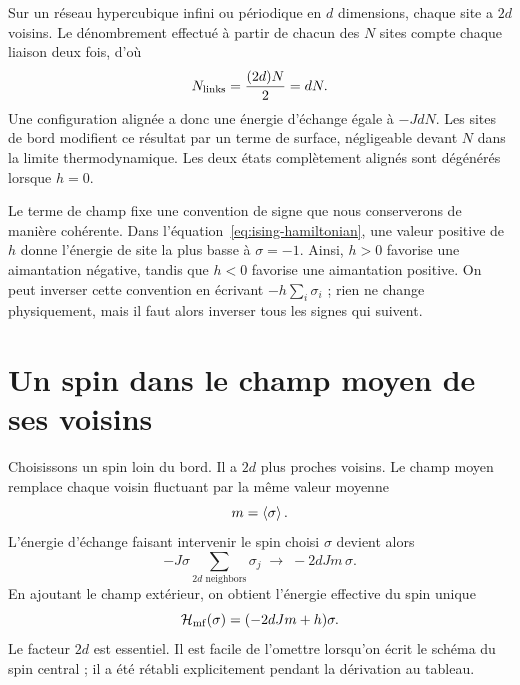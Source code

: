 Sur un réseau hypercubique infini ou périodique en \(d\) dimensions, chaque site a \(2d\) voisins. Le dénombrement effectué à partir de chacun des \(N\) sites compte chaque liaison deux fois, d’où
\begin{equation}
N_{\rm links}=\frac{(2d)N}{2}=dN.
\label{eq:number-links}
\end{equation}
Une configuration alignée a donc une énergie d’échange égale à \(-JdN\). Les sites de bord modifient ce résultat par un terme de surface, négligeable devant \(N\) dans la limite thermodynamique. Les deux états complètement alignés sont dégénérés lorsque \(h=0\).

Le terme de champ fixe une convention de signe que nous conserverons de manière cohérente. Dans l’équation~\eqref{eq:ising-hamiltonian}, une valeur positive de \(h\) donne l’énergie de site la plus basse à \(\sigma=-1\). Ainsi, \(h>0\) favorise une aimantation négative, tandis que \(h<0\) favorise une aimantation positive. On peut inverser cette convention en écrivant \(-h\sum_i\sigma_i\) ; rien ne change physiquement, mais il faut alors inverser tous les signes qui suivent.

\begin{classroomqa}
\end{classroomqa}

\section{Un spin dans le champ moyen de ses voisins}

Choisissons un spin loin du bord. Il a \(2d\) plus proches voisins. Le champ moyen remplace chaque voisin fluctuant par la même valeur moyenne
\begin{equation}
m=\left\langle\sigma\right\rangle.
\end{equation}
L’énergie d’échange faisant intervenir le spin choisi \(\sigma\) devient alors
\begin{equation}
-J\sigma\sum_{\text{\(2d\) neighbors}}\sigma_j
\;\longrightarrow\;-2dJm\,\sigma.
\end{equation}
En ajoutant le champ extérieur, on obtient l’énergie effective du spin unique
\begin{equation}
\mathcal H_{\rm mf}(\sigma)=(-2dJm+h)\sigma.
\label{eq:mean-field-one-spin}
\end{equation}
Le facteur \(2d\) est essentiel. Il est facile de l’omettre lorsqu’on écrit le schéma du spin central ; il a été rétabli explicitement pendant la dérivation au tableau.

